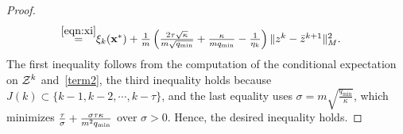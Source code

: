 \begin{proof}
\begin{align*}
 \overset{\eqref{eqn:xi}}= &\textstyle\xi_k(\vx^*)  + \frac{1}{m}
 \left(\frac{2\tau\sqrt{\kappa}}{m\sqrt{q_{\min}}} +
 {\kappa\over mq_{\min}} - \frac{1}{ \eta_k}\right) \|z^k -
 \bar{z}^{k+1}\|_M^2.
\end{align*}
The first inequality follows from the computation of the conditional expectation on ${\mathcal{Z}}^k$
and~\eqref{term2}, the third inequality holds because
$J(k)\subset\{k-1,k-2,\cdots,k-\tau\}$, and the last equality uses
$\sigma=m\sqrt{\frac{q_{\min}}{\kappa}}$, which minimizes ${\tau\over
\sigma} + \frac{\sigma\tau\kappa}{m^2q_{\min}}$ over
$\sigma>0$.
Hence, the desired inequality holds.
\hfill\end{proof}

